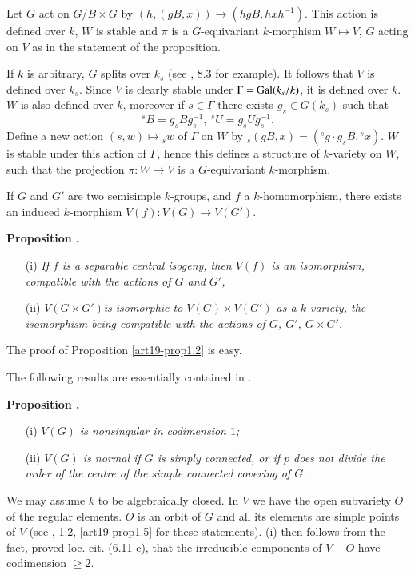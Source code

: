 Let $G$ act on $G/B\times G$ by $(h,(gB,x))\to (hgB,hxh^{-1})$. This action is defined over $k$, $W$ is stable and $\pi$ is a $G$-equivariant $k$-morphism $W\mapsto V$, $G$ acting on $V$ as in the statement of the proposition.

If $k$ is arbitrary, $G$ splits over $k_{s}$ (see \cite{art19-key2}, 8.3 for example). It follows that $V$ is defined over $k_{s}$. Since $V$ is clearly stable under $\Gamma=\operatorname{\mathrm{Gal}} (k_{s}/k)$, it is defined over $k$. $W$ is also defined over $k$, moreover if $s\in \Gamma$ there exists $g_{s}\in G(k_{s})$ such that
$$
{}^{s}B=g_{s}Bg^{-1}_{s}, \ {}^{s}U=g_{s}Ug^{-1}_{s}.
$$
Define a new action $(s,w)\mapsto {}_{s}w$ of $\Gamma$ on $W$ by ${}_{s}(gB,x)=({}^{s}g\cdot g_{s}B,{}^{s}x)$. $W$ is stable under this action of $\Gamma$, hence this defines a structure of $k$-variety on $W$, such that the projection $\pi : W\to V$ is a $G$-equivariant $k$-morphism.

If $G$ and $G'$ are two semisimple $k$-groups, and $f$ a $k$-homomorphism, there exists an induced $k$-morphism $V(f):V(G)\to V(G')$.

\medskip
\noindent
{\bf Proposition .\label{art19-prop1.2}}
\begin{itemize}
\item[\rm(i)] {\em If $f$ is a separable central isogeny, then $V(f)$ is an isomorphism, compatible with the actions of $G$ and $G'$,} 

\item[\rm(ii)] {\em $V(G\times G')$\pageoriginale is isomorphic to $V(G)\times V(G')$ as a $k$-variety, the isomorphism being compatible with the actions of $G$, $G'$, $G\times G'$.}
\end{itemize}
\smallskip

The proof of Proposition \ref{art19-prop1.2} is easy.

The following results are essentially contained in \cite{art19-key15}.

\medskip
\noindent
{\bf Proposition .\label{art19-prop1.3}}
\begin{itemize}
\item[\rm(i)] {\em $V(G)$ is nonsingular in codimension $1$;}

\item[\rm(ii)] {\em $V(G)$ is normal if $G$ is simply connected, or if $p$ does not divide the order of the centre of the simple connected covering of $G$.}
\end{itemize}

We may assume $k$ to be algebraically closed. In $V$ we have the open subvariety $O$ of the regular elements. $O$ is an orbit of $G$ and all its elements are simple points of $V$ (see \cite{art19-key15}, 1.2, \ref{art19-prop1.5} for these statements). (i) then follows from the fact, proved loc. cit. (6.11 e), that the irreducible components of $V-O$ have codimension $\geq 2$.

